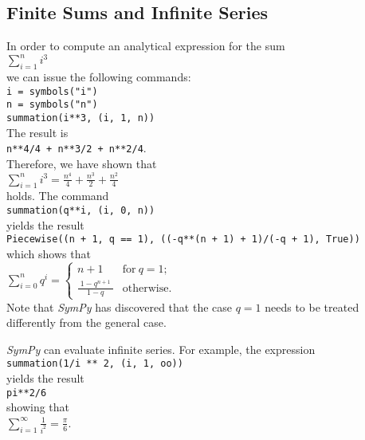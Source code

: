 \documentclass{article}
\newcommand{\ds}{\displaystyle}
\begin{document}
\subsection{Finite Sums and Infinite Series}
In order to compute an analytical expression for the sum
\\[0.2cm]
\hspace*{1.3cm}
$\ds\sum\limits_{i=1}^n i^3$
\\[0.2cm]
we can issue the following commands:
\\[0.2cm]
\hspace*{1.3cm}
\texttt{i = symbols("i")} \\  
\hspace*{1.3cm}
\texttt{n = symbols("n")} \\  
\hspace*{1.3cm}
\texttt{summation(i**3, (i, 1, n))}
\\[0.2cm]
The result is
\\[0.2cm]
\hspace*{1.3cm}
\texttt{n**4/4 + n**3/2 + n**2/4}.
\\[0.2cm]
Therefore, we have shown that
\\[0.2cm]
\hspace*{1.3cm}
$\ds\sum\limits_{i=1}^n i^3 = \frac{n^{4}}{4} + \frac{n^{3}}{2} + \frac{n^{2}}{4}$
\\[0.2cm]
holds.  
The command
\\[0.2cm]
\hspace*{1.3cm}
\texttt{summation(q**i, (i, 0, n))}
\\[0.2cm]
yields the result
\\[0.2cm]
\hspace*{1.3cm}
\texttt{Piecewise((n + 1, q == 1), ((-q**(n + 1) + 1)/(-q + 1), True))}
\\[0.2cm]
which shows that
\\[0.2cm]
\hspace*{1.3cm}
$\ds\sum\limits_{i=0}^n q^i =
\begin{cases} 
  n + 1                    & \text{for}\: q = 1\text{;} \\[0.2cm]
  \frac{\;\ds 1 - q^{n+1}\;}{\ds 1 - q} & \text{otherwise.} 
\end{cases}
$
\\[0.2cm]
Note that \textsl{SymPy} has discovered that the case $q = 1$ needs to be treated differently from
the general case.

\textsl{SymPy} can evaluate infinite series.  For example, the expression
\\[0.2cm]
\hspace*{1.3cm}
\texttt{summation(1/i ** 2, (i, 1, oo))}
\\[0.2cm]
yields the result
\\[0.2cm]
\hspace*{1.3cm}
\texttt{pi**2/6}
\\[0.2cm]
showing that
\\[0.2cm]
\hspace*{1.3cm}
$\ds\sum\limits_{i=1}^\infty \frac{1}{i^2} = \frac{\pi}{6}$.
\end{document}
